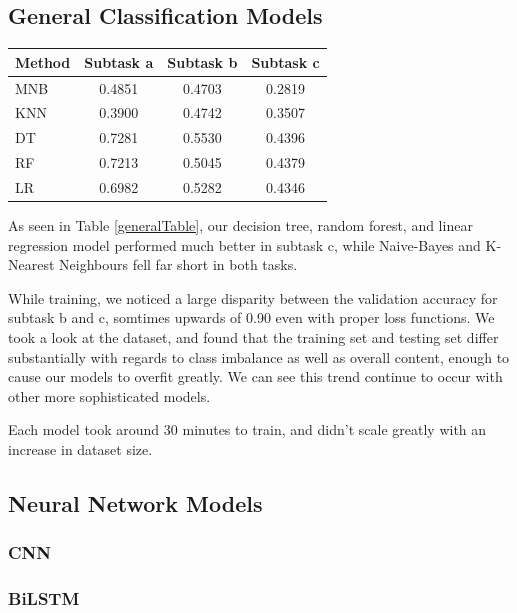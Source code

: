 \documentclass[a4paper, 12pt]{article}
\begin{document}
\begin{multicols}{2}
    \subsection{General Classification Models}
        \begin{center}
            \begin{tabular}{l|ccc}
                Method & Subtask a & Subtask b & Subtask c \\
                \hline
                MNB & 0.4851 & 0.4703 & 0.2819 \\
                KNN & 0.3900 & 0.4742 & 0.3507 \\
                DT & 0.7281 & 0.5530 & 0.4396 \\
                RF & 0.7213 & 0.5045 & 0.4379 \\
                LR & 0.6982 & 0.5282 & 0.4346
            \end{tabular}       
            \label{generalTable}
        \end{center}

        As seen in Table \ref{generalTable}, our decision tree, random forest, and linear regression model performed much better in subtask c, while Naive-Bayes and K-Nearest Neighbours fell far short in both tasks. 
        
        While training, we noticed a large disparity between the validation accuracy for subtask b and c, somtimes upwards of 0.90 even with proper loss functions. We took a look at the dataset, and found that the training set and testing set differ substantially with regards to class imbalance as well as overall content, enough to cause our models to overfit greatly. We can see this trend continue to occur with other more sophisticated models.

        Each model took around 30 minutes to train, and didn't scale greatly with an increase in dataset size.

    \subsection{Neural Network Models}
        \subsubsection{CNN}

        \subsubsection{BiLSTM}

\end{multicols}
\end{document}

